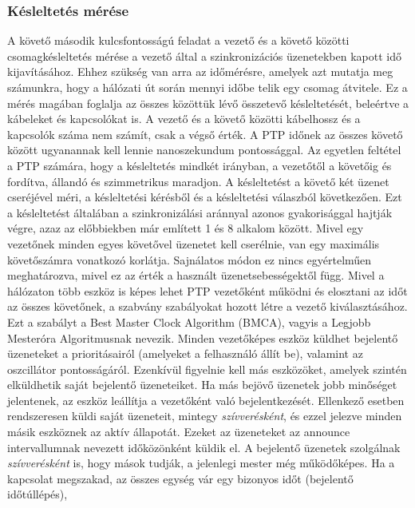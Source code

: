 \subsubsection{Késleltetés mérése}
A követő második kulcsfontosságú feladat a vezető és a követő közötti
csomagkésleltetés mérése a vezető által a szinkronizációs üzenetekben kapott
idő kijavításához. Ehhez szükség van arra az időmérésre, amelyek azt mutatja meg számunkra,
hogy a hálózati út során mennyi időbe telik egy csomag átvitele.
Ez a mérés magában foglalja az összes közöttük lévő
összetevő késleltetését, beleértve a kábeleket és kapcsolókat is. 
A vezető és a követő közötti kábelhossz és a kapcsolók száma nem számít, csak a végső érték.
A PTP időnek az összes követő között ugyanannak kell lennie nanoszekundum pontossággal.
Az egyetlen feltétel a PTP számára, hogy a késleltetés mindkét irányban, a vezetőtől a
követőig és fordítva, állandó és szimmetrikus maradjon.
A késleltetést a követő két üzenet cseréjével méri, a késleltetési kérésből és a késleltetési válaszból következően.
Ezt a késleltetést általában a szinkronizálási aránnyal azonos gyakorisággal hajtják végre, 
azaz az előbbiekben már említett 1 és 8 alkalom között.
Mivel egy vezetőnek minden egyes követővel üzenetet kell cserélnie, van egy maximális követőszámra
vonatkozó korlátja. Sajnálatos módon ez nincs egyértelműen meghatározva, mivel
ez az érték a használt üzenetsebességektől függ.
Mivel a hálózaton több eszköz is képes lehet PTP vezetőként működni és elosztani
az időt az összes követőnek, a szabvány szabályokat hozott létre a vezető
kiválasztásához. Ezt a szabályt a Best Master Clock Algorithm (BMCA), vagyis a
Legjobb Mesteróra Algoritmusnak nevezik. Minden vezetőképes eszköz küldhet
bejelentő üzeneteket a prioritásairól (amelyeket a felhasználó állít be),
valamint az oszcillátor pontosságáról. Ezenkívül figyelnie kell más eszközöket,
amelyek szintén elküldhetik saját bejelentő üzeneteiket. 
Ha más bejövő üzenetek jobb minőséget jelentenek, az eszköz leállítja a vezetőként való bejelentkezését.
Ellenkező esetben rendszeresen küldi saját üzeneteit, mintegy \textit{szívverésként},
és ezzel jelezve minden másik eszköznek az aktív állapotát. 
Ezeket az üzeneteket az announce intervallumnak nevezett időközönként küldik el. 
A bejelentő üzenetek szolgálnak \textit{szívverésként} is, hogy mások tudják, a jelenlegi mester még működőképes.
Ha a kapcsolat megszakad, az összes egység vár egy bizonyos időt (bejelentő időtúllépés),
